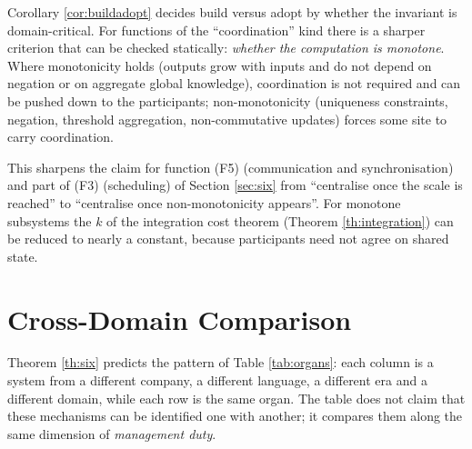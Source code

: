 \begin{remark}\label{rmk:calm}
Corollary \ref{cor:buildadopt} decides build versus adopt by whether the invariant is
domain-critical. For functions of the ``coordination'' kind there is a sharper criterion that
can be checked statically: \emph{whether the computation is monotone}. Where monotonicity
holds \cite{calm2011} (outputs grow with inputs and do not depend on negation or on
aggregate global knowledge), coordination is not required and can be pushed down to the
participants; non-monotonicity (uniqueness constraints, negation, threshold aggregation,
non-commutative updates) forces some site to carry coordination.

This sharpens the claim for function (F5) (communication and synchronisation) and part of
(F3) (scheduling) of Section \ref{sec:six} from ``centralise once the scale is reached'' to
``centralise once non-monotonicity appears''. For monotone subsystems the $k$ of the
integration cost theorem (Theorem \ref{th:integration}) can be reduced to nearly a constant,
because participants need not agree on shared state.
\end{remark}

\section{Cross-Domain Comparison}\label{sec:instances}

Theorem \ref{th:six} predicts the pattern of Table \ref{tab:organs}: each column is a system
from a different company, a different language, a different era and a different domain, while
each row is the same organ. The table does not claim that these mechanisms can be identified
one with another; it compares them along the same dimension of \emph{management duty}.

